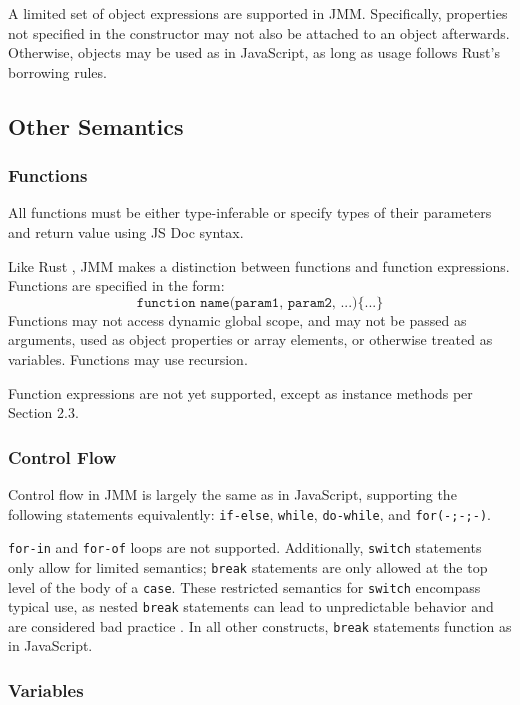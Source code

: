 \documentclass[12pt]{article}
\begin{document}
	A limited set of object expressions are supported in JMM. Specifically, properties not specified in the constructor may not also be attached to an object afterwards. Otherwise, objects may be used as in JavaScript, as long as usage follows Rust's borrowing rules.
	
	\subsection{Other Semantics}
	\subsubsection{Functions}
	
	All functions must be either type-inferable or specify types of their parameters and return value using JS Doc syntax.
	
	Like Rust \cite{Klabnik}, JMM makes a distinction between functions and function expressions. Functions are specified in the form: $$\texttt{function name(param1, param2, ...)\{...\}}$$ Functions may not access dynamic global scope, and may not be passed as arguments, used as object properties or array elements, or otherwise treated as variables. Functions may use recursion.
	
	Function expressions are not yet supported, except as instance methods per Section 2.3.
	
	\subsubsection{Control Flow}
	
	Control flow in JMM is largely the same as in JavaScript, supporting the following statements equivalently: \texttt{if-else}, \texttt{while}, \texttt{do-while}, and \texttt{for(-;-;-)}.
	
	\texttt{for-in} and \texttt{for-of} loops are not supported. Additionally, \texttt{switch} statements only allow for limited semantics; \texttt{break} statements are only allowed at the top level of the body of a \texttt{case}. These restricted semantics for \texttt{switch} encompass typical use, as nested \texttt{break} statements can lead to unpredictable behavior and are considered bad practice \cite{Motto2014}. In all other constructs, \texttt{break} statements function as in JavaScript.
	
	\subsubsection{Variables}
	
\end{document}
